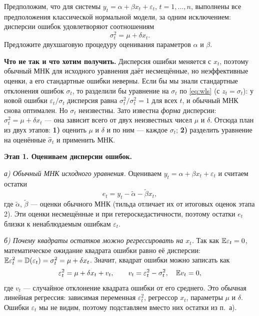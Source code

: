 
Предположим, что для системы $y_t = \alpha + \beta x_t + \varepsilon_t$,
$t = 1, \dots, n$, выполнены все предположения классической нормальной
модели, за одним исключением: дисперсии ошибок удовлетворяют соотношениям
\[
  \sigma_t^2 = \mu + \delta x_t .
\]
Предложите двухшаговую процедуру оценивания параметров $\alpha$ и $\beta$.

\begin{solution}
\textbf{Что не так и что хотим получить.} Дисперсия ошибки меняется с $x_t$,
поэтому обычный МНК для исходного уравнения даёт несмещённые, но
неэффективные оценки, а его стандартные ошибки неверны. Если бы мы знали
стандартные отклонения ошибок $\sigma_t$, то разделили бы уравнение на
$\sigma_t$ по \eqref{eq:wls} (с $z_t = \sigma_t$): у новой ошибки
$\varepsilon_t/\sigma_t$ дисперсия равна $\sigma_t^2/\sigma_t^2 = 1$ для всех
$t$, и обычный МНК снова оптимален. Но $\sigma_t$ неизвестны. Зато известна
\emph{форма} дисперсии: $\sigma_t^2 = \mu + \delta x_t$ — она зависит всего от
двух неизвестных чисел $\mu$ и $\delta$. Отсюда план из двух этапов:
\textbf{1)} оценить $\mu$ и $\delta$ и по ним — каждое $\sigma_t$;
\textbf{2)} разделить уравнение на оценённые $\widehat\sigma_t$ и применить МНК.

\fglsvisual

\medskip
\textbf{Этап 1. Оцениваем дисперсии ошибок.}

\smallskip
\emph{а) Обычный МНК исходного уравнения.} Оцениваем
$y_t = \alpha + \beta x_t + \varepsilon_t$ и считаем остатки
\[
  e_t = y_t - \widetilde\alpha - \widetilde\beta x_t ,
\]
где $\widetilde\alpha$, $\widetilde\beta$ — оценки обычного МНК (тильда
отличает их от итоговых оценок этапа 2). Эти оценки несмещённые и при
гетероскедастичности, поэтому остатки $e_t$ близки к ненаблюдаемым ошибкам
$\varepsilon_t$.

\smallskip
\emph{б) Почему квадраты остатков можно регрессировать на $x_t$.} Так как
$\mathbb{E}\varepsilon_t = 0$, математическое ожидание квадрата ошибки равно её
дисперсии: $\mathbb{E}\varepsilon_t^2 = \mathbb{D}(\varepsilon_t) = \sigma_t^2 = \mu + \delta x_t$.
Значит, квадрат ошибки можно записать как
\[
  \varepsilon_t^2 = \mu + \delta x_t + v_t ,
  \qquad
  v_t = \varepsilon_t^2 - \sigma_t^2 ,\quad \mathbb{E} v_t = 0 ,
\]
где $v_t$ — случайное отклонение квадрата ошибки от его среднего. Это обычная
линейная регрессия: зависимая переменная $\varepsilon_t^2$, регрессор $x_t$,
параметры $\mu$ и $\delta$. Ошибки $\varepsilon_t$ мы не видим, поэтому
подставляем вместо них остатки из п.~а).


\end{solution}
